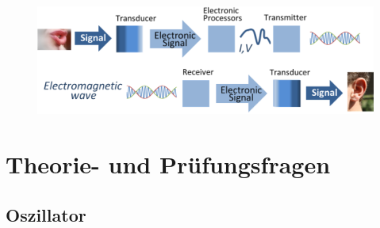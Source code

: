 \begin{figure}
 \vspace{-7cm}
  \includegraphics[scale=0.35]{Senden/Bilder/Signal_processing_system.png}
 \vspace{-7cm}
\end{figure}

\section*{Theorie- und Prüfungsfragen}


\subsection*{Oszillator}

